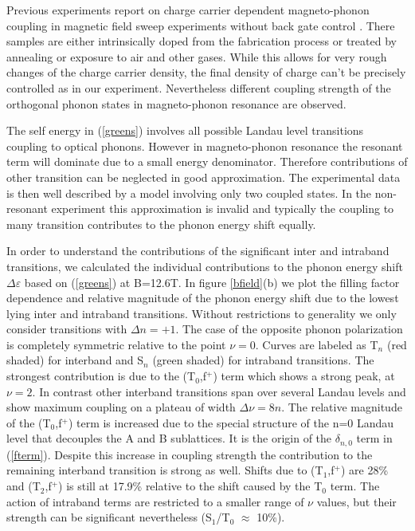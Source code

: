 \documentclass[prl,aps,superscriptaddress,showpacs,reprint]{revtex4-1}
\begin{document}
Previous experiments report on charge carrier dependent magneto-phonon coupling in magnetic field sweep experiments without back gate control \cite{PhysRevLett.110.227402,kossacki2012circular}. There samples are either intrinsically doped from the fabrication process or treated by annealing or exposure to air and other gases. While this allows for very rough changes of the charge carrier density, the final density of charge can't be precisely controlled as in our experiment. Nevertheless different coupling strength of the orthogonal phonon states in magneto-phonon resonance are observed.

The self energy in (\ref{greens}) involves all possible Landau level transitions coupling to optical phonons. However in magneto-phonon resonance the resonant term will dominate due to a small energy denominator. Therefore contributions of other transition can be neglected in good approximation. The experimental data is then well described by a model involving only two coupled states. In the non-resonant experiment this approximation is invalid and typically the coupling to many transition contributes to the phonon energy shift equally. 

In order to understand the contributions of the significant inter and intraband transitions, we calculated the individual contributions to the phonon energy shift $\Delta\varepsilon$ based on (\ref{greens}) at B=12.6T.
In figure \ref{bfield}(b) we plot the filling factor dependence and relative magnitude of the phonon energy shift due to the lowest lying inter and intraband transitions. Without restrictions to generality we only consider transitions with $\Delta n =+1$. The case of the opposite phonon polarization is completely symmetric relative to the point $\nu = 0$. Curves are labeled as T$_n$ (red shaded) for interband and S$_n$ (green shaded) for intraband transitions.  The strongest contribution is due to the (T$_0$,f$^+$) term which shows a strong peak, at $\nu=2$. In contrast other interband transitions span over several Landau levels and show maximum coupling on a plateau of width $\Delta\nu =8n$. The relative magnitude of the (T$_0$,f$^+$) term is increased due to the special structure of the n=0 Landau level that decouples the A and B sublattices. It is the origin of the $\delta_{n,0}$ term in (\ref{fterm}). Despite this increase in coupling strength the contribution to the remaining interband transition is strong as well. Shifts due to (T$_1$,f$^+$) are 28\% and (T$_2$,f$^+$) is still at 17.9\% relative to the shift caused by the T$_0$ term.
The action of intraband terms are restricted to a smaller range of $\nu$ values, but their strength can be significant nevertheless (S$_1$/T$_0$ $\approx$ 10\%).
\end{document}

